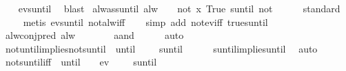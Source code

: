 \begin{isabellebody}
%
\isadelimproof
\ \ %
\endisadelimproof
%
\isatagproof
{}\isamarkupfalse%
\ ev{\isacharunderscore}suntil\ \isamarkupfalse%
\ blast%
\endisatagproof
{\isafoldproof}%
%
\isadelimproof
\isanewline
%
\endisadelimproof
\isanewline
{}\isamarkupfalse%
\ alw{\isacharunderscore}as{\isacharunderscore}suntil{\isacharcolon}\ {\isachardoublequoteopen}alw\ {\isasymphi}\ {\isasymomega}\ {\isacharequal}\ not\ {\isacharparenleft}{\isacharparenleft}{\isasymlambda}x{\isachardot}\ True{\isacharparenright}\ suntil\ {\isacharparenleft}not\ {\isasymphi}{\isacharparenright}{\isacharparenright}\ {\isasymomega}{\isachardoublequoteclose}\isanewline
%
\isadelimproof
\ \ %
\endisadelimproof
%
\isatagproof
{}\isamarkupfalse%
\ standard\isanewline
\ \ \ \isamarkupfalse%
\ {\isacharparenleft}metis\ ev{\isacharunderscore}suntil\ not{\isacharunderscore}alw{\isacharunderscore}iff{\isacharparenright}\isanewline
\ \ \isamarkupfalse%
\ {\isacharparenleft}simp\ add{\isacharcolon}\ not{\isacharunderscore}ev{\isacharunderscore}iff\ true{\isacharunderscore}suntil{\isacharparenright}%
\endisatagproof
{\isafoldproof}%
%
\isadelimproof
\isanewline
%
\endisadelimproof
\isanewline
{}\isamarkupfalse%
\ alw{\isacharunderscore}conj{\isacharunderscore}pred{\isacharcolon}\ {\isachardoublequoteopen}alw\ {\isasymchi}\ {\isasymomega}\ {\isasymLongrightarrow}\ {\isasympsi}\ {\isasymomega}\ {\isacharequal}\ {\isacharparenleft}{\isasympsi}\ aand\ {\isasymchi}{\isacharparenright}\ {\isasymomega}{\isachardoublequoteclose}\isanewline
%
\isadelimproof
\ \ %
\endisadelimproof
%
\isatagproof
{}\isamarkupfalse%
\ auto%
\endisatagproof
{\isafoldproof}%
%
\isadelimproof
\isanewline
%
\endisadelimproof
\isanewline
{}\isamarkupfalse%
\ not{\isacharunderscore}until{\isacharunderscore}implies{\isacharunderscore}not{\isacharunderscore}suntil{\isacharcolon}\ {\isachardoublequoteopen}{\isasymnot}{\isacharparenleft}{\isasymphi}\ until\ {\isasympsi}{\isacharparenright}\ {\isasymomega}\ {\isasymLongrightarrow}\ {\isasymnot}{\isacharparenleft}{\isasymphi}\ suntil\ {\isasympsi}{\isacharparenright}\ {\isasymomega}{\isachardoublequoteclose}\isanewline
%
\isadelimproof
\ \ %
\endisadelimproof
%
\isatagproof
{}\isamarkupfalse%
\ suntil{\isacharunderscore}implies{\isacharunderscore}until\ \isamarkupfalse%
\ auto%
\endisatagproof
{\isafoldproof}%
%
\isadelimproof
\isanewline
%
\endisadelimproof
\isanewline
{}\isamarkupfalse%
\ not{\isacharunderscore}suntil{\isacharunderscore}iff{\isacharcolon}\ {\isachardoublequoteopen}{\isasymnot}{\isacharparenleft}{\isasymphi}\ until\ {\isasympsi}{\isacharparenright}\ {\isasymomega}\ {\isasymor}\ {\isasymnot}ev\ {\isasympsi}\ {\isasymomega}\ {\isasymLongrightarrow}\ {\isasymnot}{\isacharparenleft}{\isasymphi}\ suntil\ {\isasympsi}{\isacharparenright}\ {\isasymomega}{\isachardoublequoteclose}\isanewline

\end{isabellebody}
